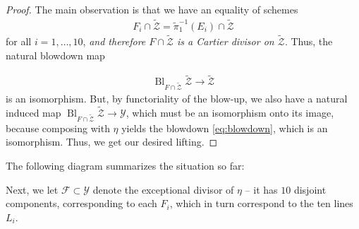 \documentclass[12pt,reqno]{amsart}
\DeclareMathOperator{\id}{id}
\DeclareMathOperator{\Bl}{Bl}
\renewcommand{\to}{{\longrightarrow}}
\numberwithin{equation}{section}
\newcommand{\td}{\widetilde}
\begin{document}
\begin{proof}
  The main observation is that we have an equality of schemes
  \begin{align}
    \label{eq:Cartier}
    F_i \cap \widetilde{\mathcal{Z}} = \widetilde{\pi}_{1}^{-1}(E_i) \cap \widetilde{\mathcal{Z}}
  \end{align}
  for all $i=1, \dots, 10$, {\sl and therefore
    $F \cap \widetilde{\mathcal{Z}}$ is a Cartier divisor on
    $\widetilde{\mathcal{Z}}$}.  Thus, the natural blowdown map

  \begin{align}
    \label{eq:blowdown}
    \Bl_{F \cap \td{\mathcal{Z}}}\td{\mathcal{Z}} \to \td{\mathcal{Z}}
  \end{align}
  is an isomorphism.  But, by functoriality of the blow-up, we also
  have a natural induced map
  $\Bl_{F \cap \td{\mathcal{Z}}}\td{\mathcal{Z}} \to \mathcal{Y}$,
  which must be an isomorphism onto its image, because composing with
  $\eta$ yields the blowdown \eqref{eq:blowdown}, which is an
  isomorphism.  Thus, we get our desired lifting.
\end{proof}

The following diagram summarizes the situation so far:

\begin{center}
\end{center}

Next, we let $\mathcal{F} \subset \mathcal{Y}$ denote the exceptional
divisor of $\eta$ -- it has $10$ disjoint components, corresponding to
each $F_{i}$, which in turn correspond to the ten lines $L_{i}$.
\end{document}
